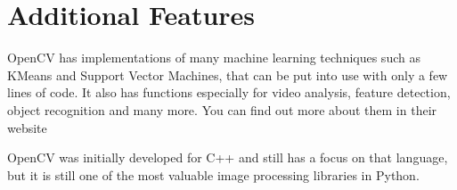 \section{Additional Features}

OpenCV has implementations of many machine learning techniques such as
KMeans and Support Vector Machines, that can be put into use with only
a few lines of code. It also has functions especially for video
analysis, feature detection, object recognition and many more. You can
find out more about them in their website


OpenCV was initially developed for C++ and still has a focus on that
language, but it is still one of the most valuable image processing
libraries in Python.
